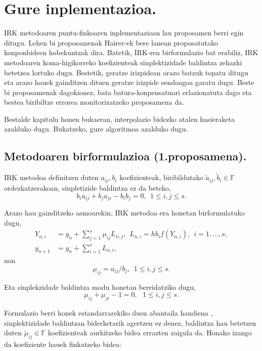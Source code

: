 \section{Gure inplementazioa.}

IRK metodoaren puntu-finkoaren inplementazioan lau proposamen berri egin ditugu. Lehen bi proposamenak  Hairer-ek bere lanean proposatutako konponbideen hobekuntzak dira. Batetik, IRK-ren birformulazio bat erabiliz, IRK metodoaren koma-higikorreko koefizienteak sinplektizidade baldintza zehazki betetzea lortuko dugu. Bestetik, geratze irizpidean arazo batzuk topatu ditugu eta arazo hauek gainditzen dituen geratze irizpide sendoagoa garatu dugu. Beste bi proposamenak dagokionez, bata batura-konpensatuari erlazionatuta dago eta bestea biribiltze errorea monitorizatzeko proposamena da.

Bestalde kapitulu honen bukaeran, interpolazio bidezko atalen hasieraketa azalduko dugu. Bukatzeko, gure algoritmoa azalduko dugu.  

\subsection{Metodoaren birformulazioa (1.proposamena).}

IRK metodoa definitzen duten $a_{ij},b_i$ koefizienteak, biribildutako $\tilde a_{ij},\tilde b_i \in \mathbb{F}$ ordezkatzerakoan, sinpletizide baldintza ez da beteko,
\begin{equation} \label{eq:61}
b_{i}a_{ij}+b_{j}a_{ji}-b_{i}b_{j}=0, \ \ 1 \leqslant i,j \leqslant s.
\end{equation}  
  
Arazo hau gainditzeko asmoarekin, IRK metodoa era honetan birformulatuko dugu,
\begin{align}
\label{eq:62}
Y_{n,i}&=y_n+ \sum\limits_{j=1}^{s} \mu_{ij} L_{n,j},  \ \ L_{n,i}=hb_if(Y_{n,i}), \ \ i=1,\dots,s,\\
y_{n+1}&=y_n+\sum\limits_{i=1}^{s} L_{n,i},
\end{align}
non 
\begin{equation*}
\mu_{ij}=a_{ij}/{b_j}, \ \ 1 \le i,j \le s.
\end{equation*}

Eta sinplekzidade baldintza modu honetan berridatziko dugu,
\begin{equation}
\mu_{ij}+\mu_{ji}-1=0, \ \ \ 1 \le i,j \le s.
\end{equation}

Formulazio berri honek  estandarrarekiko duen abantaila handiena , sinplektizidade baldintzan biderketarik agertzen ez denez,  baldintza hau betetzen duten $\tilde \mu_{ij} \in \mathbb{F}$ koefizienteak aurkitzeko bidea errazten zaigula da. Honako izango da koefiziente hauek finkatzeko bidea:

